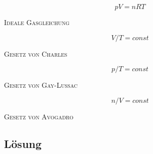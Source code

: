 \documentclass[12pt,a4paper]{article}
\renewcommand{\=}[1]{\stackrel{#1}{=}}
\theoremstyle{definition}
\theoremstyle{remark}
\begin{document}
\begin{center}
\begin{minipage}[t]{.45\linewidth}
\vspace{0pt}

\begin{framed}
$$pV = nRT$$
\begin{center}
\textsc{Ideale Gasgleichung}
\end{center}
\end{framed}

\begin{framed}
$$V/T = const$$
\begin{center}
\textsc{Gesetz von Charles}
\end{center}
\end{framed}

\end{minipage}%
\hspace{0.02\linewidth}
\begin{minipage}[t]{.45\linewidth}
\vspace{0pt}

\begin{framed}
$$p/T = const$$
\begin{center}
\textsc{Gesetz von Gay-Lussac}
\end{center}
\end{framed}


\begin{framed}
$$n/V = const$$
\begin{center}
\textsc{Gesetz von Avogadro}
\end{center}
\end{framed}

\end{minipage}
\end{center}



\subsection{Lösung}
\end{document}
